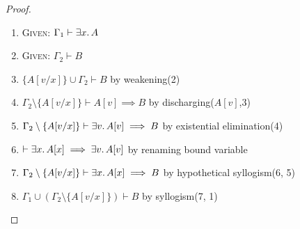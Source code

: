 \begin{proof}
\begin{enumerate}
\item\textsc{Given:} $\Gamma_{1}\vdash\exists x\ldotp A$%
\item\textsc{Given:} $\Gamma_{2}\vdash B$%
\item $\{A[v/x]\}\cup\Gamma_{2}\vdash B$ by weakening(2)%
\item $\Gamma_{2}\setminus\{A[v/x]\}\vdash A[v]\implies B$ by discharging($A[v]$,3)%
\item $\Gamma_{2}\setminus\{A[v/x]\}\vdash \exists v\ldotp A[v]\implies B$
  by existential elimination(4)%
\item $\vdash\exists x\ldotp A[x]\implies\exists v\ldotp A[v]$
  by renaming bound variable%
\item $\Gamma_{2}\setminus\{A[v/x]\}\vdash \exists x\ldotp A[x]\implies B$
  by hypothetical syllogism(6, 5)%
\item $\Gamma_{1}\cup(\Gamma_{2}\setminus\{A[v/x]\})\vdash B$
  by syllogism(7, 1)\qedhere%
\end{enumerate}
\end{proof}

